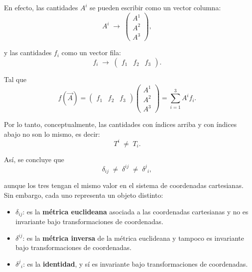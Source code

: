 \documentclass[../apunte_mecanica_clasica.tex]{subfiles}%
\begin{document}
En efecto, las cantidades $A^i$ se pueden escribir como un vector columna:
\begin{equation*}
        A^i \;\longrightarrow\;
    \begin{pmatrix}
        A^1 \\
        A^2 \\
        A^3
    \end{pmatrix},
\end{equation*}

y las cantidades $f_i$ como un vector fila:
\begin{equation*}
    f_i \;\longrightarrow\;
    \begin{pmatrix}
        f_1 & f_2 & f_3
    \end{pmatrix}.    
\end{equation*}

Tal que
\begin{equation*}
    f(\vec{A}) =
    \begin{pmatrix}
        f_1 & f_2 & f_3
    \end{pmatrix}
    \begin{pmatrix}
        A^1 \\
        A^2 \\
        A^3
    \end{pmatrix}
    = \sum_{i=1}^3 A^i f_i.
\end{equation*}

Por lo tanto, conceptualmente, las cantidades con 
índices arriba y con índices abajo no son lo mismo, 
es decir:
\begin{equation*}
    T^i \;\neq\; T_i.
\end{equation*}

Así, se concluye que
\begin{equation*}
    \delta_{ij} \;\neq\; \delta^{ij} \;\neq\; \delta^j{}_i,
\end{equation*}

aunque los tres tengan el mismo valor en el sistema de coordenadas cartesianas.  
Sin embargo, cada uno representa un objeto distinto:

\begin{itemize}
    \item $\delta_{ij}$: es la \textbf{métrica euclideana} asociada a las coordenadas cartesianas  
    y no es invariante bajo transformaciones de coordenadas.

    \item $\delta^{ij}$: es la \textbf{métrica inversa} de la métrica euclideana  
    y tampoco es invariante bajo transformaciones de coordenadas.

    \item $\delta^j{}_i$: es la \textbf{identidad}, y sí es invariante bajo transformaciones de coordenadas.
\end{itemize}
\end{document}
